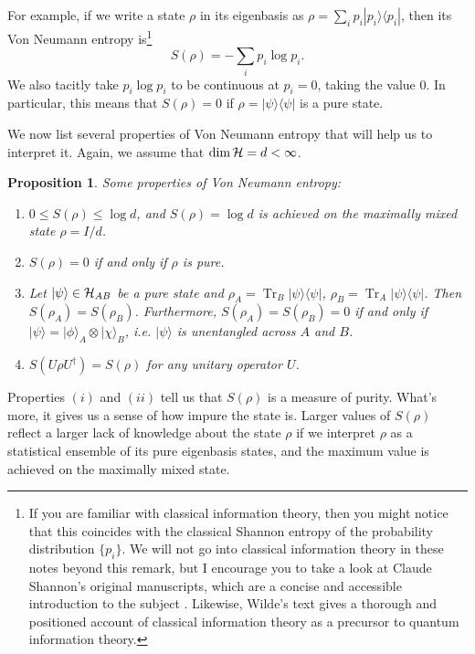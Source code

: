 \documentclass[a4paper,11pt]{article}
\newtheorem{prop}[thm]{Proposition}
\DeclareMathOperator{\Tr}{Tr}
\newcommand{\ket}[1]{|#1\rangle}
\newcommand{\ketbra}[2]{| #1 \rangle \langle #2 |}
\newcommand{\Hil}{{\cal H}}
\begin{document}
For example, if we write a state $\rho$ in its eigenbasis as $\rho = \sum_i p_i \ketbra{p_i}{p_i}$, then its Von Neumann entropy is\footnote{If you are familiar with classical information theory, then you might notice that this coincides with the classical Shannon entropy of the probability distribution $\{p_i\}$.
We will not go into classical information theory in these notes beyond this remark, but I encourage you to take a look at Claude Shannon's original manuscripts, which are a concise and accessible introduction to the subject \cite{shannon}.
Likewise, Wilde's text \cite{Wilde:2011npi} gives a thorough and positioned account of classical information theory as a precursor to quantum information theory.}
\begin{equation}
S(\rho) = - \sum_i p_i \log p_i .
\end{equation}
We also tacitly take $p_i \log p_i$ to be continuous at $p_i = 0$, taking the value 0.
In particular, this means that $S(\rho) = 0$ if $\rho = \ketbra{\psi}{\psi}$ is a pure state.

We now list several properties of Von Neumann entropy that will help us to interpret it.
Again, we assume that $\dim \Hil = d < \infty$.

\begin{prop} Some properties of Von Neumann entropy:
\begin{enumerate}[label=(\roman*)]
\item $0 \leq S(\rho) \leq \log d$, and $S(\rho) = \log d$ is achieved on the maximally mixed state $\rho = I/d$.
\item $S(\rho) = 0$ if and only if $\rho$ is pure.
\item Let $\ket{\psi} \in \Hil_{AB}$ be a pure state and $\rho_A = \Tr_B \ketbra{\psi}{\psi}$, $\rho_B = \Tr_A \ketbra{\psi}{\psi}$. Then $S(\rho_A) = S(\rho_B)$.
Furthermore, $S(\rho_A) = S(\rho_B) = 0$ if and only if $\ket{\psi} = \ket{\phi}_A \otimes \ket{\chi}_B$, i.e. $\ket{\psi}$ is \emph{unentangled} across $A$ and $B$.
\item $S(U \rho U^\dagger) = S(\rho)$ for any unitary operator $U$.
\end{enumerate}
\end{prop}

Properties $(i)$ and $(ii)$ tell us that $S(\rho)$ is a measure of purity.
What's more, it gives us a sense of how impure the state is.
Larger values of $S(\rho)$ reflect a larger lack of knowledge about the state $\rho$ if we interpret $\rho$ as a statistical ensemble of its pure eigenbasis states, and the maximum value is achieved on the maximally mixed state.
\end{document}
